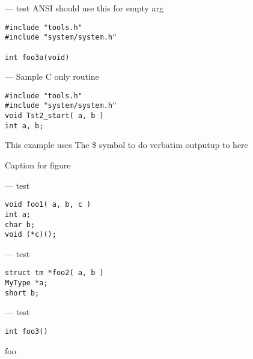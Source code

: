 \endmanpage
\startmanpage
{}
--- test ANSI should use this for empty arg 
\startvb\begin{verbatim}
#include "tools.h"
#include "system/system.h"

int foo3a(void)
\end{verbatim}
\endvb

\endmanpage
\startmanpage
{}
--- Sample C only routine 
\startvb\begin{verbatim}
#include "tools.h"
#include "system/system.h"
void Tst2_start( a, b )
int a, b;
\end{verbatim}
\endvb
This example uses
\linebreak   The \$ symbol to do verbatim output\linebreak   up to here
\par
\centerline{}\begin{center}\bf
\par
Caption for figure
\end{center}
\par
\par
\par
{}
\endmanpage
\startmanpage
{}
--- test  
\startvb\begin{verbatim}
void foo1( a, b, c )
int a;
char b;
void (*c)();
\end{verbatim}
\endvb

\endmanpage
\startmanpage
{}
--- test  
\startvb\begin{verbatim}
struct tm *foo2( a, b )
MyType *a;
short b;
\end{verbatim}
\endvb

\endmanpage
\startmanpage
{}
--- test 
\startvb\begin{verbatim}
int foo3()
\end{verbatim}
\endvb

foo
\endmanpage
